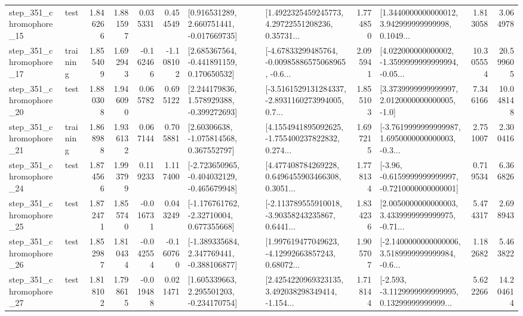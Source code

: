 \begin{tabular}{llrrrrllrlrr}
  step\_351\_chromophore\_15 &      test &      1.846266 &    1.881597 &      0.035331 &  0.454549 &    [0.916531289, 2.660751441, -0.017669735] &  [1.4922325459245773, 4.29722551208236, 0.35731... &       1.774850 &  [1.3440000000000012, 3.942999999999998, 0.1049... &            1.813058 &          3.064978 \\
  step\_351\_chromophore\_17 &  training &      1.855409 &    1.692943 &     -0.162466 & -1.108102 &    [2.685367564, -0.441891159, 0.170650532] &  [-4.67833299485764, -0.00985886575068965, -0.6... &       2.095941 &  [4.022000000000002, -1.3599999999999994, -0.05... &           10.305554 &         20.599605 \\
  step\_351\_chromophore\_20 &      test &      1.880308 &    1.946090 &      0.065782 &  0.695122 &    [2.244179836, 1.578929388, -0.399272693] &  [-3.5161529131284337, -2.8931160273994005, 0.7... &       1.855103 &     [3.3739999999999997, 2.0120000000000005, -1.0] &            7.346166 &         10.048148 \\
  step\_351\_chromophore\_21 &  training &      1.868988 &    1.936132 &      0.067144 &  0.705881 &     [2.60306638, -1.075814568, 0.367552797] &  [4.1554941895092625, -1.755400237822832, 0.274... &       1.697215 &  [-3.7619999999999987, 1.6950000000000003, -0.3... &            2.751007 &          2.300416 \\
  step\_351\_chromophore\_24 &      test &      1.874566 &    1.993799 &      0.119233 &  1.117400 &  [-2.723650965, -0.404032129, -0.465679948] &  [4.477408784269228, 0.6496455903466308, 0.3051... &       1.778134 &  [-3.96, -0.6159999999999997, -0.7210000000000001] &            0.719534 &          6.366826 \\
  step\_351\_chromophore\_25 &      test &      1.872471 &    1.855740 &     -0.016731 &  0.043249 &    [-1.176761762, -2.32710004, 0.677355668] &  [-2.113789555910018, -3.90358243235867, 0.6441... &       1.834236 &  [2.0050000000000003, 3.4339999999999975, -0.71... &            5.474317 &          2.698943 \\
  step\_351\_chromophore\_26 &      test &      1.852987 &    1.810434 &     -0.042554 & -0.160760 &   [-1.389335684, 2.347769441, -0.388106877] &  [1.997619477049623, -4.12992663857243, 0.68072... &       1.905707 &  [-2.1400000000000006, 3.5189999999999984, -0.6... &            1.182682 &          5.463822 \\
  step\_351\_chromophore\_27 &      test &      1.818102 &    1.798615 &     -0.019488 &  0.021471 &    [1.605339663, 2.295501203, -0.234170754] &  [2.4254220969323135, 3.492038298349414, -1.154... &       1.718144 &  [-2.593, -3.1129999999999995, 0.13299999999999... &            5.622266 &         14.204614 \\

\end{tabular}
